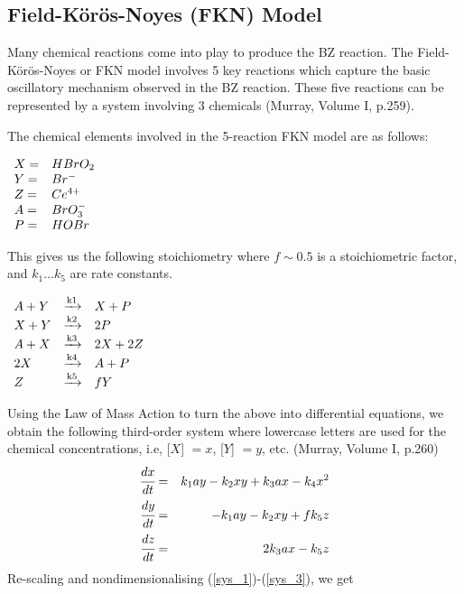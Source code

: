\documentclass[]{article}
\numberwithin{equation}{section}		%
\def\bea{\begin{eqnarray}}
\def\ena{\end{eqnarray}}
\begin{document}
\subsection{Field-K\"{o}r\"{o}s-Noyes (FKN) Model}
Many chemical reactions come into play to produce the BZ reaction. The Field-K\"{o}r\"{o}s-Noyes or FKN model involves 5 key reactions which capture the basic oscillatory mechanism observed in the BZ reaction. These five reactions can be represented by a system involving 3 chemicals (Murray, Volume I, p.259).
 

The chemical elements involved in the 5-reaction FKN model are as follows:

\begin{center}
$\begin{array}{l l}
X = & H Br O_2 \\
Y = & Br^- \\
Z = & Ce^{4+} \\
A = & BrO_3^- \\
P = & HOBr
\end{array} $
\end{center}


This gives us the following stoichiometry where $f \sim 0.5$ is a stoichiometric factor, and $k_{1} \ldots k_{5}$ are rate constants.

\begin{center}
$\begin{array}{l c l}
A + Y & \xrightarrow{\text{k1}} & X + P \\
X + Y & \xrightarrow{\text{k2}} & 2P \\
A + X & \xrightarrow{\text{k3}} & 2X + 2Z \\
2X & \xrightarrow{\text{k4}} & A + P \\
Z & \xrightarrow{\text{k5}}& fY
\end{array} $
\end{center}

Using the Law of Mass Action to turn the above into differential equations, we obtain the following third-order system where lowercase letters are used for the chemical concentrations, i.e, [$X$] $=x$, [$Y$] $=y$, etc. (Murray, Volume I, p.260)  
\bea
\label{sys_1}
\cfrac{dx}{dt} & = & k_1 ay - k_2 xy + k_3 ax - k_4 x^2\\
\label{sys_2}
\cfrac{dy}{dt} & = & -k_1 ay - k_2 xy + f k_5 z \\
\label{sys_3}
\cfrac{dz}{dt} & = & 2k_3 ax - k_5 z
\ena
Re-scaling and nondimensionalising (\ref{sys_1})-(\ref{sys_3}), we get
\end{document}
